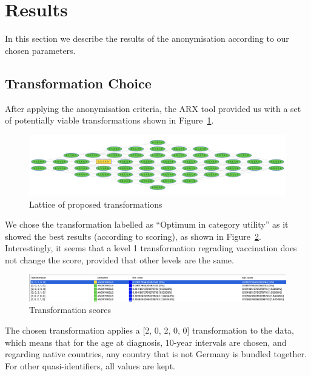 \documentclass[parskip=half]{scrartcl}
\newcommand\figref{Figure~\ref}
\begin{document}
\section{Results}

In this section we describe the results of the anonymisation according to our
chosen parameters.

\subsection{Transformation Choice}

After applying the anonymisation criteria, the ARX tool provided us with a set
of potentially viable transformations shown in
\figref{fig:transformation-lattice}.

\begin{figure}[ht]
    \begin{center}
        \includegraphics[width=\textwidth]{transformation_lattice}
        \caption{Lattice of proposed transformations}
        \label{fig:transformation-lattice}
    \end{center}
\end{figure}

We chose the transformation labelled as ``Optimum in category utility'' as it
showed the best results (according to scoring), as shown in
\figref{fig:transformation-scores}. Interestingly, it seems that a level 1
transformation regrading vaccination does not change the score, provided that
other levels are the same.

\begin{figure}[ht]
    \begin{center}
        \includegraphics[width=\textwidth]{transformation_scores}
        \caption{Transformation scores}
        \label{fig:transformation-scores}
    \end{center}
\end{figure}

The chosen transformation applies a [2, 0, 2, 0, 0] transformation to the data,
which means that for the age at diagnosis, $10$-year intervals are chosen, and
regarding native countries, any country that is not Germany is bundled
together. For other quasi-identifiers, all values are kept.
\end{document}
